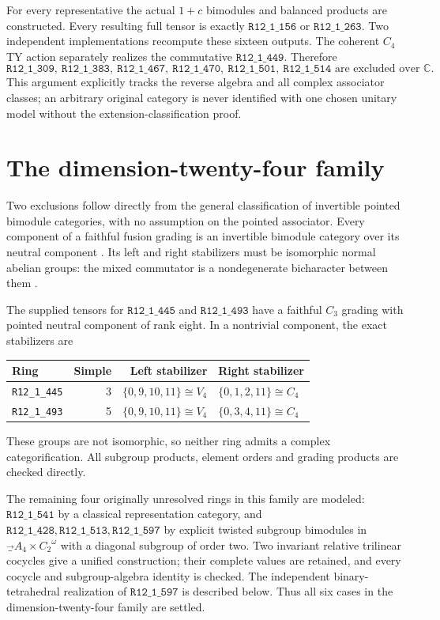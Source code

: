 \documentclass[11pt]{article}
\newcommand{\ring}[1]{\texttt{R12\_1\_#1}}
\begin{document}
For every representative the actual $1+c$ bimodules and balanced products are
constructed. Every resulting full tensor is exactly $\ring{156}$ or $\ring{263}$.
Two independent implementations recompute these sixteen outputs. The coherent
$C_4$ TY action separately realizes the commutative $\ring{449}$. Therefore
\[
 \boxed{\ring{309},\ \ring{383},\ \ring{467},\ \ring{470},\ \ring{501},\ \ring{514}
 \text{ are excluded over }\mathbb C.}
\]
This argument explicitly tracks the reverse algebra and all complex associator
classes; an arbitrary original category is never identified with one chosen unitary
model without the extension-classification proof.

\section{The dimension-twenty-four family}
Two exclusions follow directly from the general classification of invertible
pointed bimodule categories, with no assumption on the pointed associator.
Every component of a faithful fusion grading is an invertible bimodule category
over its neutral component \cite[Theorem 6.1]{ENO}. Its left and right stabilizers
must be isomorphic normal abelian groups: the mixed commutator is a nondegenerate
bicharacter between them \cite[Theorem 7.9 and Corollary 7.11]{GP}.

The supplied tensors for $\ring{445}$ and $\ring{493}$ have a faithful $C_3$
grading with pointed neutral component of rank eight. In a nontrivial component,
the exact stabilizers are
\begin{center}\begin{tabular}{lrrl}\toprule Ring&Simple&Left stabilizer&Right stabilizer\\\midrule
\ring{445}&3&$\{0,9,10,11\}\cong V_4$&$\{0,1,2,11\}\cong C_4$\\
\ring{493}&5&$\{0,9,10,11\}\cong V_4$&$\{0,3,4,11\}\cong C_4$\\\bottomrule\end{tabular}\end{center}
These groups are not isomorphic, so neither ring admits a complex categorification.
All subgroup products, element orders and grading products are checked directly.

The remaining four originally unresolved rings in this family are modeled:
$\ring{541}$ by a classical representation category, and
$\ring{428},\ring{513},\ring{597}$ by explicit twisted subgroup bimodules in
$\Vec_{A_4\times C_2}^{\omega}$ with a diagonal subgroup of order two.
Two invariant relative trilinear cocycles give a unified construction; their complete
values are retained, and every cocycle and subgroup-algebra identity is checked.
The independent binary-tetrahedral realization of $\ring{597}$ is described below.
Thus all six cases in the dimension-twenty-four family are settled.
\end{document}

